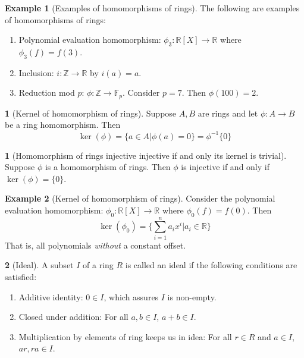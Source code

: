 \documentclass[12pt]{article}
\theoremstyle{definition}
\newtheorem{definition}{\color{NavyBlue}{\textbf{Definition}}}
\newtheorem{theorem}{\color{ForestGreen}{\textbf{Theorem}}}
\newcommand{\R}{\mathbb{R}}
\newcommand{\Z}{\mathbb{Z}}
\newtheorem{example}{\color{WildStrawberry}Example}
\theoremstyle{definition}
\begin{document}
\begin{example}[Examples of homomorphisms of rings]
	The following are examples of homomorphisms of rings:
	\begin{enumerate}
		\item Polynomial evaluation homomorphism: $\phi_3:\R[X] \to \R$ where $\phi_3(f) = f(3)$.
		\item Inclusion: $i: \Z \to \R$ by $i(a) = a$. 
		\item Reduction mod $p$: $\phi : \Z \to \mathbb{F}_p$. Consider $p=7$. Then $\phi(100) = 2$.
	\end{enumerate}
\end{example}

\begin{definition}[Kernel of homomorphism of rings]
	Suppose $A,B$ are rings and let $\phi:A \to B$ be a ring homomorphism. Then
	\begin{equation}
		\ker(\phi) = \{a \in A | \phi(a) = 0\} = \phi^{-1}\{0\}
	\end{equation}
\end{definition}

\begin{theorem}[Homomorphism of rings injective injective if and only its kernel is trivial]
	Suppose $\phi$ is a homomorphism of rings. Then $\phi$ is injective if and only if $\ker(\phi) = \{0\}$.
\end{theorem}

\begin{example}[Kernel of homomorphism of rings]
	Consider the polynomial evaluation homomorphism: $\phi_0:\R[X] \to \R$ where $\phi_0(f) = f(0)$. Then
	\begin{equation}
		\ker(\phi_0) = \{\sum_{i=1}^n a_i x^i | a_i \in \R \}
	\end{equation}
	That is, all polynomials \emph{without} a constant offset.
\end{example}

\begin{definition}[Ideal]
	A subset $I$ of a ring $R$ is called an ideal if the following conditions are satisfied:
	\begin{enumerate}
		\item Additive identity: $0 \in I$, which assures $I$ is non-empty.
		\item Closed under addition: For all $a,b \in I$, $a+b \in I$.
		\item Multiplication by elements of ring keeps us in idea: For all $r \in R$ and $a \in I$, $ar, ra \in I$. 
	\end{enumerate}
\end{definition}
\end{document}
